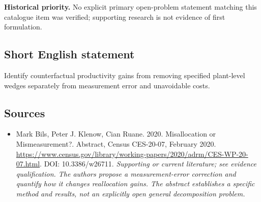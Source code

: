 \documentclass[11pt]{article}
\begin{document}
\par\textbf{Historical priority.} No explicit primary open-problem statement matching this catalogue item was verified; supporting research is not evidence of first formulation.

\subsection{Short English statement}
Identify counterfactual productivity gains from removing specified plant-level wedges separately from measurement error and unavoidable costs.

\subsection{Sources}
\begin{itemize}\raggedright
\item[\textnormal{[S1]}]\hypertarget{source:30007543:1}{} Mark Bils, Peter J. Klenow, Cian Ruane. 2020. Misallocation or Mismeasurement?. Abstract, Census CES-20-07, February 2020.
\url{https://www.census.gov/library/working-papers/2020/adrm/CES-WP-20-07.html}.
DOI: 10.3386/w26711.
{\small\textit{Supporting or current literature; see evidence qualification. The authors propose a measurement-error correction and quantify how it changes reallocation gains. The abstract establishes a specific method and results, not an explicitly open general decomposition problem.}}
\end{itemize}
\end{document}
